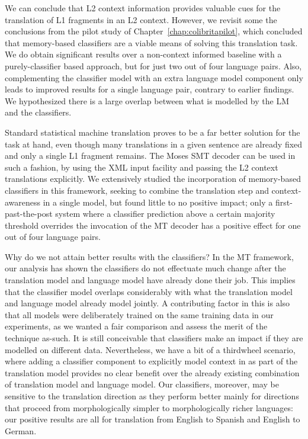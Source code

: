 We can conclude that L2 context information provides valuable cues for the
translation of L1 fragments in an L2 context. However, we revisit some the
conclusions from the pilot study of Chapter~\ref{chap:colibritapilot}, which
concluded that memory-based classifiers are a viable means of solving this
translation task.  We do obtain significant results over a non-context informed
baseline with a purely-classifier based approach, but for just two out of four
language pairs.  Also, complementing the classifier model with an extra
language model component only leads to improved results for a single language
pair, contrary to earlier findings. We hypothesized there is a large overlap
between what is modelled by the LM and the classifiers.

Standard statistical machine translation proves to be a far better solution for
the task at hand, even though many translations in a given sentence are already
fixed and only a single L1 fragment remains. The Moses SMT decoder can be used
in such a fashion, by using the XML input facility and passing the L2 context
translations explicitly.  We extensively studied the incorporation of
memory-based classifiers in this framework, seeking to combine the translation
step and context-awareness in a single model, but found little to no positive
impact; only a first-past-the-post system where a classifier prediction above a
certain majority threshold overrides the invocation of the MT decoder has a
positive effect for one out of four language pairs.

Why do we not attain better results with the classifiers? In the MT framework,
our analysis has shown the classifiers do not effectuate much change after the
translation model and language model have already done their job. This implies
that the classifier model overlaps considerably with what the translation model
and language model already model jointly. A contributing factor in this is also
that all models were deliberately trained on the same training data in our
experiments, as we wanted a fair comparison and assess the merit of the
technique as-such. It is still conceivable that classifiers make an impact if
they are modelled on different data. Nevertheless, we have a bit of a
thirdwheel scenario, where adding a classifier component to explicitly model
context in as part of the translation model provides no clear
benefit over the already existing combination of translation model and language
model. Our classifiers, moreover, may be sensitive to the translation direction
as they perform better mainly for directions that proceed from morphologically simpler to
morphologically richer languages: our positive results are all for translation
from English to Spanish and English to German.

